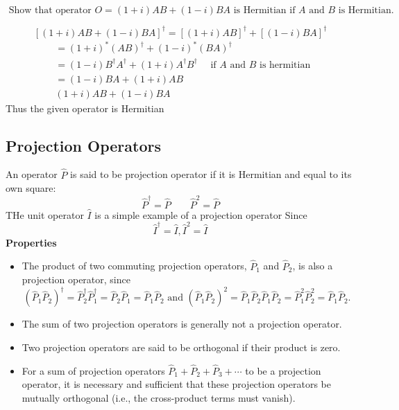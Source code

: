 \begin{exercise}
	$\text { Show that operator } O=(1+i) A B+(1-i) B A \text { is Hermitian if } A \text { and } B \text { is Hermitian. }$
\end{exercise}
\begin{answer}
$$[(1+i) A B+(1-i) B A]^{\dagger}=[(1+i) A B]^{\dagger}+[(1-i) B A]^{\dagger}$$	
$$
\begin{aligned}
&=(1+i)^{*}(A B)^{\dagger}+(1-i)^{*}(B A)^{\dagger} \\
&=(1-i) B^{\dagger} A^{\dagger}+(1+i) A^{\dagger} B^{\dagger} \quad \text { if } A \text { and } B \text { is hermitian } \\
&=(1-i) B A+(1+i) A B \\
&(1+i) A B+(1-i) B A
\end{aligned}
$$
Thus the given operator is Hermitian
\end{answer}
\subsection{Projection Operators}
An operator $\hat{P}$ is said to be projection operator if it is Hermitian and equal to its own square:\\
$$\hat{P}^{\dagger}=\hat{P} \quad \quad \hat{P}^2=\hat{P}$$
THe unit operator $\hat{I}$ is a simple example of a projection operator Since $$\hat{I}^{\dagger}=\hat{I}, \hat{I}^2=\hat{I}$$
\textbf{Properties}\\
\begin{itemize}
	\item The product of two commuting projection operators, $\hat{P}_{1}$ and $\hat{P}_{2}$, is also a projection operator, since
	$$
	\left(\hat{P}_{1} \hat{P}_{2}\right)^{\dagger}=\hat{P}_{2}^{\dagger} \hat{P}_{1}^{\dagger}=\hat{P}_{2} \hat{P}_{1}=\hat{P}_{1} \hat{P}_{2} \text { and }\left(\hat{P}_{1} \hat{P}_{2}\right)^{2}=\hat{P}_{1} \hat{P}_{2} \hat{P}_{1} \hat{P}_{2}=\hat{P}_{1}^{2} \hat{P}_{2}^{2}=\hat{P}_{1} \hat{P}_{2} \text {. }
	$$
	\item  The sum of two projection operators is generally not a projection operator.
	\item  Two projection operators are said to be orthogonal if their product is zero.
	\item For a sum of projection operators $\hat{P}_{1}+\hat{P}_{2}+\hat{P}_{3}+\cdots$ to be a projection operator, it is necessary and sufficient that these projection operators be mutually orthogonal (i.e., the cross-product terms must vanish).
\end{itemize}
